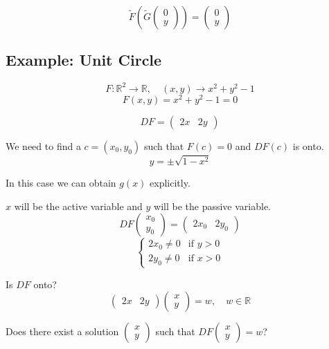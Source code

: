 \documentclass[11pt]{article}
\begin{document}
\[
\tilde{F} \left( \tilde{G} \begin{pmatrix}
    0 \\
    y
\end{pmatrix} \right) = \begin{pmatrix}
    0 \\
    y
\end{pmatrix}
\]

\subsection*{Example: Unit Circle}
\[
F : \mathbb{R}^2 \rightarrow \mathbb{R}, \quad (x,y) \rightarrow x^2 + y^2 - 1
\]
\[
F(x,y) = x^2 + y^2 - 1 = 0
\]

\[
DF = \begin{pmatrix}
    2x & 2y
\end{pmatrix}
\]

We need to find a $c = (x_0,y_0)$ such that $F(c) = 0$ and $DF(c)$ is onto.
\[
y = \pm \sqrt{1 - x^2}
\]

In this case we can obtain $g(x)$ explicitly.

$x$ will be the active variable and $y$ will be the passive variable.
\[
DF \begin{pmatrix}
    x_0 \\
    y_0
\end{pmatrix} = \begin{pmatrix}
    2x_0 & 2y_0
\end{pmatrix}
\]
\[
\begin{cases}
    2x_0 \neq 0 & \text{if } y > 0 \\
    2y_0 \neq 0 & \text{if } x > 0
\end{cases}
\]

Is $DF$ onto?
\[
\begin{pmatrix}
    2x & 2y
\end{pmatrix} \begin{pmatrix}
    x \\
    y
\end{pmatrix} = w, \quad w \in \mathbb{R}
\]

Does there exist a solution $\begin{pmatrix}
    x \\
    y
\end{pmatrix}$ such that $DF \begin{pmatrix}
    x \\
    y
\end{pmatrix} = w$?
\end{document}

